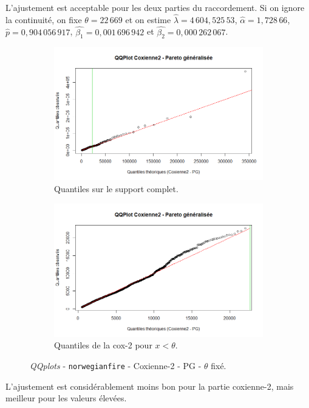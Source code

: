 		L'ajustement est acceptable pour les deux parties du raccordement. Si on ignore la continuité, on fixe $\theta = 22\,669$ et on estime $\hat{\lambda}=4\,604,525\,53$, $\hat{\alpha} = 1,728\,66$, $\hat{p} =0,904\,056\,917$, $\hat{\beta_1}=0,001\,696\,942$ et $\hat{\beta_2} = 0,000\,262\,067$.
		
		\begin{figure}[H]
			\begin{center}
				\begin{subfigure}[b]{0.45\textwidth}
					\includegraphics[scale=0.40]{Graphiques/QQ_Cox_PG_choix} 
					\caption{Quantiles sur le support complet.} \label{QQplot_Cox_PG_choix}
				\end{subfigure}
				\begin{subfigure}[b]{0.4\textwidth}
					\includegraphics[scale=0.40]{Graphiques/QQ_Cox_PG_choix_t1} 
					\caption{Quantiles de la cox-2 pour $x<\theta$.} \label{QQplot_Cox_PG_choix_2}
				\end{subfigure}
				\renewcommand{\figurename}{Illustration}
				\caption{\textit{QQplots} - \texttt{norwegianfire} - Coxienne-2 - PG - $\theta$ fixé.}
			\end{center}
		\end{figure}
		L'ajustement est considérablement moins bon pour la partie coxienne-2, mais meilleur pour les valeurs élevées.
		 
